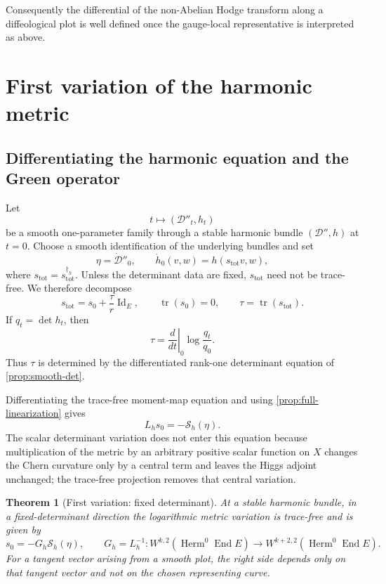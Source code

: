 \documentclass[11pt,reqno]{amsart}
\newtheorem{theorem}{Theorem}[section]
\theoremstyle{definition}
\theoremstyle{remark}
\newcommand{\cD}{\mathcal D}
\newcommand{\cS}{\mathcal S}
\newcommand{\End}{\operatorname{End}}
\newcommand{\Herm}{\operatorname{Herm}}
\newcommand{\Id}{\operatorname{Id}}
\newcommand{\tr}{\operatorname{tr}}
\begin{document}
Consequently the differential of the non-Abelian Hodge transform along a diffeological plot is well defined once the gauge-local representative is interpreted as above.

\section{First variation of the harmonic metric}\label{sec:first-variation}

\subsection{Differentiating the harmonic equation and the Green operator}

Let
\[
  t\longmapsto (\cD''_t,h_t)
\]
be a smooth one-parameter family through a stable harmonic bundle $(\cD'',h)$ at $t=0$.  Choose a smooth identification of the underlying bundles and set
\begin{equation}\label{eq:eta-s-def}
  \eta=\dot{\cD}''_0,
  \qquad
  \dot h_0(v,w)=h(s_{\mathrm{tot}}v,w),
\end{equation}
where $s_{\mathrm{tot}}=s_{\mathrm{tot}}^{\dagger_h}$.  Unless the determinant data are fixed, $s_{\mathrm{tot}}$ need not be trace-free.  We therefore decompose
\begin{equation}\label{eq:metric-trace-split}
  s_{\mathrm{tot}}=s_0+\frac{\tau}{r}\Id_E,
  \qquad
  \tr(s_0)=0,
  \qquad
  \tau=\tr(s_{\mathrm{tot}}).
\end{equation}
If $q_t=\det h_t$, then
\begin{equation}\label{eq:tau-det}
  \tau=\left.\frac{d}{dt}\right|_{0}
  \log\frac{q_t}{q_0}.
\end{equation}
Thus $\tau$ is determined by the differentiated rank-one determinant equation of \cref{prop:smooth-det}.

Differentiating the trace-free moment-map equation and using \cref{prop:full-linearization} gives
\begin{equation}\label{eq:first-variation-PDE}
  L_hs_0=-\cS_h(\eta).
\end{equation}
The scalar determinant variation does not enter this equation because multiplication of the metric by an arbitrary positive scalar function on $X$ changes the Chern curvature only by a central term and leaves the Higgs adjoint unchanged; the trace-free projection removes that central variation.

\begin{theorem}[First variation: fixed determinant]\label{thm:first-variation-metric}
At a stable harmonic bundle, in a fixed-determinant direction the logarithmic metric variation is trace-free and is given by
\begin{equation}\label{eq:first-variation-Green}
  s_0=-G_h\cS_h(\eta),
  \qquad
  G_h=L_h^{-1}:
  W^{k,2}(\Herm^0\End E)\to W^{k+2,2}(\Herm^0\End E).
\end{equation}
For a tangent vector arising from a smooth plot, the right side depends only on that tangent vector and not on the chosen representing curve.
\end{theorem}
\end{document}
